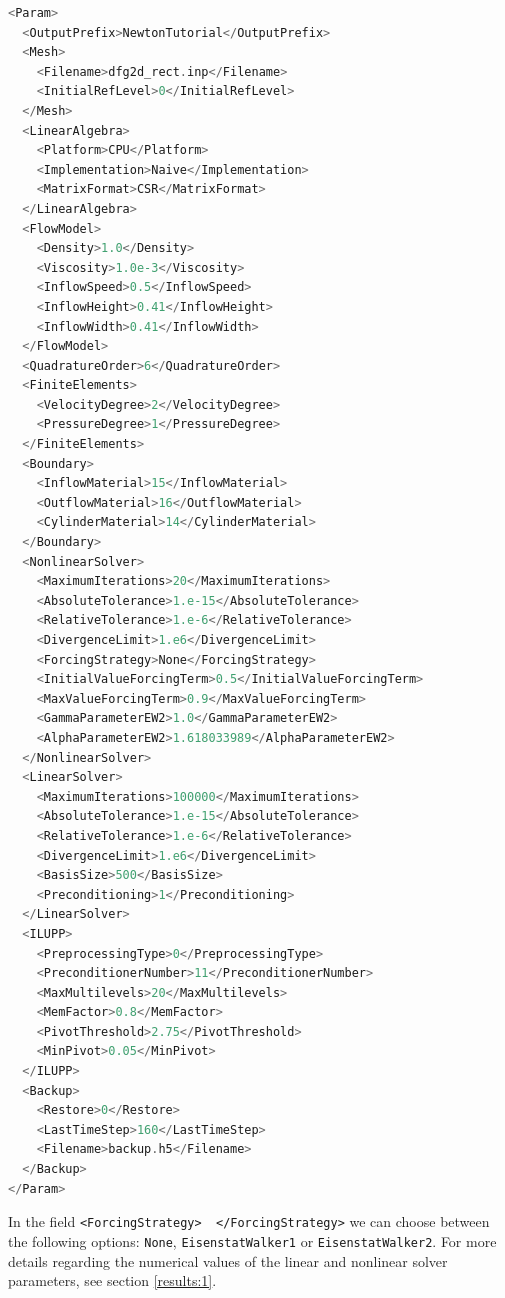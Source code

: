 \documentclass[a4paper, 11pt, twoside]{article}
\begin{document}
\begin{lstlisting}[language=C++, basicstyle={\footnotesize, \ttfamily}, keywordstyle=\color{blue}, numbers=none, tabsize=4]    
<Param>
  <OutputPrefix>NewtonTutorial</OutputPrefix>
  <Mesh>
    <Filename>dfg2d_rect.inp</Filename>
    <InitialRefLevel>0</InitialRefLevel>
  </Mesh>
  <LinearAlgebra>
    <Platform>CPU</Platform>
    <Implementation>Naive</Implementation>
    <MatrixFormat>CSR</MatrixFormat>
  </LinearAlgebra>
  <FlowModel>
    <Density>1.0</Density>
    <Viscosity>1.0e-3</Viscosity>
    <InflowSpeed>0.5</InflowSpeed>
    <InflowHeight>0.41</InflowHeight>
    <InflowWidth>0.41</InflowWidth>
  </FlowModel>
  <QuadratureOrder>6</QuadratureOrder>
  <FiniteElements>
    <VelocityDegree>2</VelocityDegree>
    <PressureDegree>1</PressureDegree>
  </FiniteElements>
  <Boundary>
    <InflowMaterial>15</InflowMaterial>
    <OutflowMaterial>16</OutflowMaterial>
    <CylinderMaterial>14</CylinderMaterial>
  </Boundary>
  <NonlinearSolver>    
    <MaximumIterations>20</MaximumIterations>
    <AbsoluteTolerance>1.e-15</AbsoluteTolerance>
    <RelativeTolerance>1.e-6</RelativeTolerance>
    <DivergenceLimit>1.e6</DivergenceLimit>    
    <ForcingStrategy>None</ForcingStrategy>
    <InitialValueForcingTerm>0.5</InitialValueForcingTerm>
    <MaxValueForcingTerm>0.9</MaxValueForcingTerm>
    <GammaParameterEW2>1.0</GammaParameterEW2>
    <AlphaParameterEW2>1.618033989</AlphaParameterEW2>
  </NonlinearSolver>
  <LinearSolver>
    <MaximumIterations>100000</MaximumIterations>
    <AbsoluteTolerance>1.e-15</AbsoluteTolerance>
    <RelativeTolerance>1.e-6</RelativeTolerance>
    <DivergenceLimit>1.e6</DivergenceLimit>
    <BasisSize>500</BasisSize>
    <Preconditioning>1</Preconditioning>
  </LinearSolver>
  <ILUPP>
    <PreprocessingType>0</PreprocessingType>
    <PreconditionerNumber>11</PreconditionerNumber>
    <MaxMultilevels>20</MaxMultilevels>
    <MemFactor>0.8</MemFactor>
    <PivotThreshold>2.75</PivotThreshold>
    <MinPivot>0.05</MinPivot>
  </ILUPP>
  <Backup>
    <Restore>0</Restore>
    <LastTimeStep>160</LastTimeStep>
    <Filename>backup.h5</Filename>
  </Backup>
</Param>
\end{lstlisting}

In the field \verb+<ForcingStrategy>  </ForcingStrategy>+ we can choose between the following options: \verb+None+, \verb+EisenstatWalker1+ or \verb+EisenstatWalker2+. For more details regarding the numerical values of the linear and nonlinear solver parameters, see section \ref{results:1}.
\end{document}
